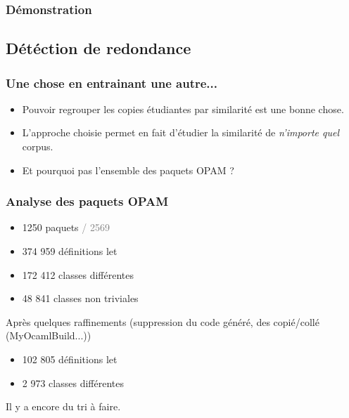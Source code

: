 \documentclass[11pt]{beamer}
\begin{document}
\begin{frame}
\frametitle{Démonstration}
\end{frame}

\subsection{Détéction de redondance}
\begin{frame}
\frametitle{Une chose en entrainant une autre...}

\begin{itemize}
\item Pouvoir regrouper les copies étudiantes par similarité est une bonne chose.
\item L'approche choisie permet en fait d'étudier la similarité de \emph{n'importe quel} corpus.
\item Et pourquoi pas l'ensemble des paquets OPAM ?
\end{itemize}
\end{frame}

\begin{frame}
	\frametitle{Analyse des paquets OPAM}
	\begin{itemize}
		\item 1250 paquets \textcolor{gray}{/ 2569}
		\item 374 959 définitions let
		\item 172 412 classes différentes
		\item 48 841 classes non triviales
	\end{itemize}
\pause
Après quelques raffinements (suppression du code généré, des copié/collé (MyOcamlBuild...))
\begin{itemize}
	\item 102 805 définitions let
	\item 2 973 classes différentes
\end{itemize}
\pause
Il y a encore du tri à faire.
\end{frame}
\end{document}
